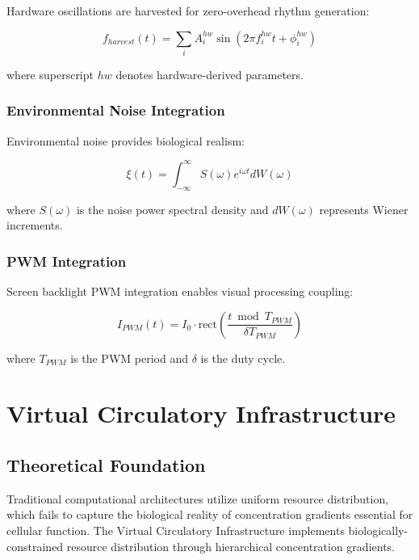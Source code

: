 \documentclass[12pt,a4paper]{article}
\begin{document}
Hardware oscillations are harvested for zero-overhead rhythm generation:

\begin{equation}
f_{harvest}(t) = \sum_i A_i^{hw} \sin(2\pi f_i^{hw} t + \phi_i^{hw})
\end{equation}

where superscript $hw$ denotes hardware-derived parameters.

\subsubsection{Environmental Noise Integration}

Environmental noise provides biological realism:

\begin{equation}
\xi(t) = \int_{-\infty}^{\infty} S(\omega) e^{i\omega t} dW(\omega)
\end{equation}

where $S(\omega)$ is the noise power spectral density and $dW(\omega)$ represents Wiener increments.

\subsubsection{PWM Integration}

Screen backlight PWM integration enables visual processing coupling:

\begin{equation}
I_{PWM}(t) = I_0 \cdot \text{rect}\left(\frac{t \bmod T_{PWM}}{\delta T_{PWM}}\right)
\end{equation}

where $T_{PWM}$ is the PWM period and $\delta$ is the duty cycle.

\section{Virtual Circulatory Infrastructure}

\subsection{Theoretical Foundation}

Traditional computational architectures utilize uniform resource distribution, which fails to capture the biological reality of concentration gradients essential for cellular function. The Virtual Circulatory Infrastructure implements biologically-constrained resource distribution through hierarchical concentration gradients.
\end{document}

